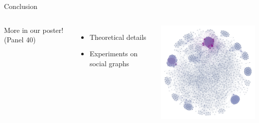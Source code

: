 \documentclass[xetex,10pt,mathserif]{beamer}
\begin{document}
\begin{frame}{Conclusion}
\begin{columns}[c]
{\large More in our poster! (Panel 40)}
\vspace{2em}
\begin{itemize}
\item Theoretical details
\vspace{1em}
\item Experiments on social graphs
\end{itemize}
\includegraphics[width=2.9in]{figures/graph_white.png}
\end{columns}
\end{frame}
\end{document}
